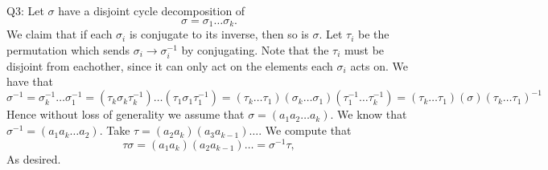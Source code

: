 \documentclass[letterpaper]{article}
\begin{document}
\noindent Q3: Let $\sigma$ have a disjoint cycle decomposition of $$\sigma = \sigma_1 \dots \sigma_k. $$ We claim that if each $\sigma_i$ is conjugate to its inverse, then so is $\sigma$. Let $\tau_i$ be the permutation which sends $\sigma_i \to \sigma_i^{-1}$ by conjugating. Note that the $\tau_i$ must be disjoint from eachother, since it can only act on the elements each $\sigma_i$ acts on. We have that 
$$\sigma^{-1} = \sigma_k^{-1} \dots \sigma_{1}^{-1} = (\tau_k \sigma_k \tau_k^{-1}) \dots (\tau_1 \sigma_1 \tau_1^{-1}) = (\tau_k \dots \tau_1) (\sigma_k \dots \sigma_1)(\tau_1^{-1} \dots \tau_{k}^{-1}) = (\tau_k \dots \tau_1) ( \sigma) (\tau_k \dots \tau_1)^{-1} $$
Hence without loss of generality we assume that $\sigma = (a_1 a_2 \dots a_k)$. We know that $\sigma^{-1} = (a_1 a_k \dots a_2)$. Take $\tau = (a_2 a_k)(a_3 a_{k-1}) \dots$. We compute that $$\tau \sigma = (a_1 a_k) (a_2 a_{k-1}) \dots = \sigma^{-1}\tau, $$
As desired.  
\end{document}
